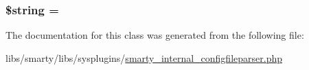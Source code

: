 \subsubsection[{\$string}]{\setlength{\rightskip}{0pt plus 5cm}\$string = \textquotesingle{}\textquotesingle{}}\label{class_t_p_c__yy_token_a05bc82187ba145848edd864852f4bd37}


The documentation for this class was generated from the following file\+:\begin{DoxyCompactItemize}
\item 
libs/smarty/libs/sysplugins/\hyperlink{smarty__internal__configfileparser_8php}{smarty\+\_\+internal\+\_\+configfileparser.\+php}\end{DoxyCompactItemize}
